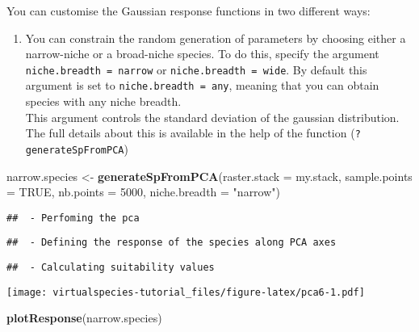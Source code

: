 \documentclass[]{article}
\newenvironment{Shaded}{\begin{snugshade}}{\end{snugshade}}
\newcommand{\KeywordTok}[1]{\textcolor[rgb]{0.13,0.29,0.53}{\textbf{#1}}}
\newcommand{\DataTypeTok}[1]{\textcolor[rgb]{0.13,0.29,0.53}{#1}}
\newcommand{\DecValTok}[1]{\textcolor[rgb]{0.00,0.00,0.81}{#1}}
\newcommand{\StringTok}[1]{\textcolor[rgb]{0.31,0.60,0.02}{#1}}
\newcommand{\OtherTok}[1]{\textcolor[rgb]{0.56,0.35,0.01}{#1}}
\newcommand{\NormalTok}[1]{#1}
\providecommand{\tightlist}{%
  \setlength{\itemsep}{0pt}\setlength{\parskip}{0pt}}
\begin{document}
You can customise the Gaussian response functions in two different ways:

\begin{enumerate}
\def\labelenumi{\arabic{enumi}.}
\tightlist
\item
  You can constrain the random generation of parameters by choosing
  either a narrow-niche or a broad-niche species. To do this, specify
  the argument
  \texttt{niche.breadth\ =\ \textquotesingle{}narrow\textquotesingle{}}
  or
  \texttt{niche.breadth\ =\ \textquotesingle{}wide\textquotesingle{}}.
  By default this argument is set to
  \texttt{niche.breadth\ =\ \textquotesingle{}any\textquotesingle{}},
  meaning that you can obtain species with any niche breadth.\\
  This argument controls the standard deviation of the gaussian
  distribution. The full details about this is available in the help of
  the function (\texttt{?generateSpFromPCA})
\end{enumerate}

\begin{Shaded}
\begin{Highlighting}[]
\NormalTok{narrow.species <-}\StringTok{ }\KeywordTok{generateSpFromPCA}\NormalTok{(}\DataTypeTok{raster.stack =}\NormalTok{ my.stack, }\DataTypeTok{sample.points =} \OtherTok{TRUE}\NormalTok{,}
                                    \DataTypeTok{nb.points =} \DecValTok{5000}\NormalTok{,}
                                    \DataTypeTok{niche.breadth =} \StringTok{"narrow"}\NormalTok{)}
\end{Highlighting}
\end{Shaded}

\begin{verbatim}
##  - Perfoming the pca
\end{verbatim}

\begin{verbatim}
##  - Defining the response of the species along PCA axes
\end{verbatim}

\begin{verbatim}
##  - Calculating suitability values
\end{verbatim}

\texttt{[image: virtualspecies-tutorial\_files/figure-latex/pca6-1.pdf]}

\begin{Shaded}
\begin{Highlighting}[]
\KeywordTok{plotResponse}\NormalTok{(narrow.species)}
\end{Highlighting}
\end{Shaded}
\end{document}
